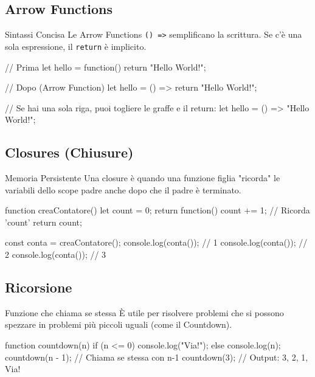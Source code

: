 \subsection{Arrow Functions}
\begin{concept}{Sintassi Concisa}
Le Arrow Functions \texttt{() =>} semplificano la scrittura. Se c'è una sola espressione, il \texttt{return} è implicito.
\end{concept}
\begin{jsbox}
// Prima
let hello = function() {
    return "Hello World!";
}

// Dopo (Arrow Function)
let hello = () => {
    return "Hello World!";
}

// Se hai una sola riga, puoi togliere le graffe e il return:
let hello = () => "Hello World!";
\end{jsbox}

\subsection{Closures (Chiusure)}
\begin{concept}{Memoria Persistente}
Una closure è quando una funzione figlia "ricorda" le variabili dello scope padre anche dopo che il padre è terminato.
\end{concept}
\begin{jsbox}
function creaContatore() {
    let count = 0;
    return function() {
        count += 1; // Ricorda 'count'
        return count;
    }
}

const conta = creaContatore();
console.log(conta()); // 1
console.log(conta()); // 2
console.log(conta()); // 3
\end{jsbox}

\subsection{Ricorsione}
\begin{concept}{Funzione che chiama se stessa}
È utile per risolvere problemi che si possono spezzare in problemi più piccoli uguali (come il Countdown).
\end{concept}
\begin{jsbox}
function countdown(n) {
    if (n <= 0) {
        console.log("Via!");
    } else {
        console.log(n);
        countdown(n - 1); // Chiama se stessa con n-1
    }
}
countdown(3);
// Output: 3, 2, 1, Via!
\end{jsbox}
